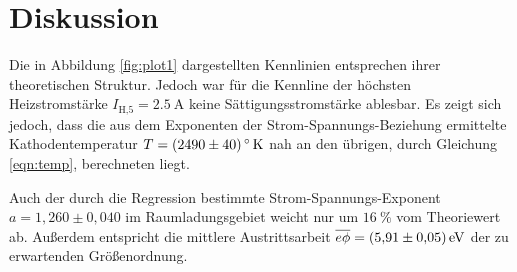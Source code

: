 \section{Diskussion}
\label{sec:Diskussion}

Die in Abbildung \ref{fig:plot1} dargestellten Kennlinien
entsprechen ihrer theoretischen Struktur. Jedoch
war für die Kennline der höchsten Heizstromstärke
$I_\text{H,5} = \SI{2.5}{\ampere}$ keine Sättigungsstromstärke
ablesbar. Es zeigt sich jedoch, dass die
aus dem Exponenten der Strom-Spannungs-Beziehung
ermittelte Kathodentemperatur $T = \SI{2490 +- 40}{\degree\kelvin}$ 
nah an den übrigen, durch Gleichung \eqref{eqn:temp}, berechneten liegt.

Auch der durch die Regression bestimmte Strom-Spannungs-Exponent $a = 1,260  \pm 0,040$
im Raumladungsgebiet weicht nur um $\SI{16}{\percent}$ vom Theoriewert ab. Außerdem entspricht die 
mittlere Austrittsarbeit $\overline{e\phi} = \SI{5.91 +- 0.05}{\eV}$ der zu erwartenden Größenordnung.
